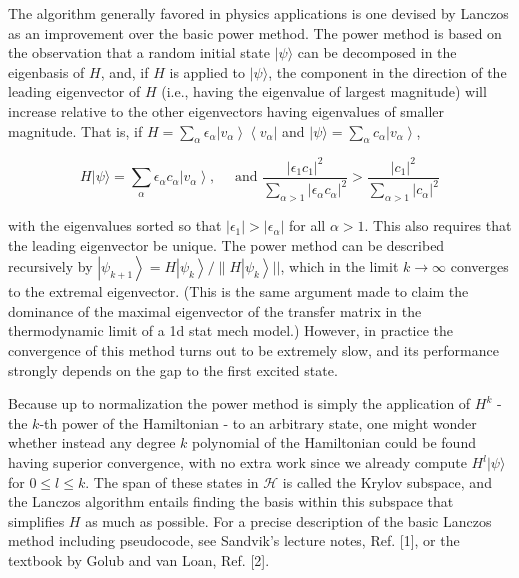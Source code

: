 \documentclass[10pt]{article}
\begin{document}
The algorithm generally favored in physics applications is one devised by Lanczos as an improvement over the basic power method. The power method is based on the observation that a random initial state $|\psi\rangle$ can be decomposed in the eigenbasis of $H$, and, if $H$ is applied to $|\psi\rangle$, the component in the direction of the leading eigenvector of $H$ (i.e., having the eigenvalue of largest magnitude) will increase relative to the other eigenvectors having eigenvalues of smaller magnitude. That is, if $H=\sum_{\alpha} \epsilon_{\alpha}\left|v_{\alpha}\right\rangle\left\langle v_{\alpha}\right|$ and $|\psi\rangle=\sum_{\alpha} c_{\alpha}\left|v_{\alpha}\right\rangle$,


\begin{equation*}
H|\psi\rangle=\sum_{\alpha} \epsilon_{\alpha} c_{\alpha}\left|v_{\alpha}\right\rangle, \quad \text { and } \frac{\left|\epsilon_{1} c_{1}\right|^{2}}{\sum_{\alpha>1}\left|\epsilon_{\alpha} c_{\alpha}\right|^{2}}>\frac{\left|c_{1}\right|^{2}}{\sum_{\alpha>1}\left|c_{\alpha}\right|^{2}} \tag{11}
\end{equation*}


with the eigenvalues sorted so that $\left|\epsilon_{1}\right|>\left|\epsilon_{\alpha}\right|$ for all $\alpha>1$. This also requires that the leading eigenvector be unique. The power method can be described recursively by $\left|\psi_{k+1}\right\rangle=H\left|\psi_{k}\right\rangle / \| H\left|\psi_{k}\right\rangle||$, which in the limit $k \rightarrow \infty$ converges to the extremal eigenvector. (This is the same argument made to claim the dominance of the maximal eigenvector of the transfer matrix in the thermodynamic limit of a 1d stat mech model.) However, in practice the convergence of this method turns out to be extremely slow, and its performance strongly depends on the gap to the first excited state.

Because up to normalization the power method is simply the application of $H^{k}$ - the $k$-th power of the Hamiltonian - to an arbitrary state, one might wonder whether instead any degree $k$ polynomial of the Hamiltonian could be found having superior convergence, with no extra work since we already compute $H^{l}|\psi\rangle$ for $0 \leq l \leq k$. The span of these states in $\mathcal{H}$ is called the Krylov subspace, and the Lanczos algorithm entails finding the basis within this subspace that simplifies $H$ as much as possible. For a precise description of the basic Lanczos method including pseudocode, see Sandvik's lecture notes, Ref. [1], or the textbook by Golub and van Loan, Ref. [2].
\end{document}
